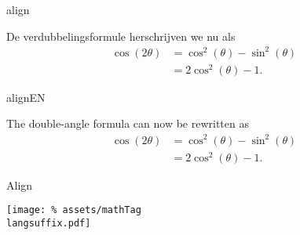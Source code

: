 


\begin{saveblock}{align}
	\begin{highlightblock}[gobble=8,linewidth=\textwidth,
		framexleftmargin=0.25em,xleftmargin=0.25em]
		De verdubbelingsformule herschrijven we nu als
		\begin{align*}
			\cos(2\theta) &= \cos^2(\theta) - \sin^2(\theta)\\
			&= 2\cos^2(\theta)-1. \tag{$ * $}
		\end{align*}
	\end{highlightblock}
\end{saveblock}

\begin{saveblock}{alignEN}
	\begin{highlightblock}[gobble=8,linewidth=\textwidth,
		framexleftmargin=0.25em,xleftmargin=0.25em]
		The double-angle formula can now be rewritten as
		\begin{align*}
			\cos(2\theta) &= \cos^2(\theta) - \sin^2(\theta)\\
			&= 2\cos^2(\theta)-1. \tag{$ * $}
		\end{align*}
	\end{highlightblock}
\end{saveblock}

\begin{frame}{Align}

	\texttt{[image: \%
		assets/mathTag\\langsuffix.pdf]}
\end{frame}

